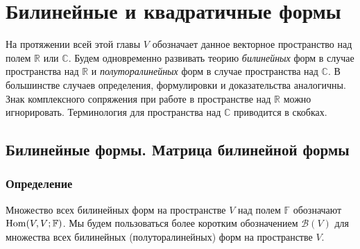 \chapter{Билинейные и квадратичные формы}\label{kvadr_formy}

На протяжении всей этой главы $V$ обозначает данное векторное пространство над полем $\mathbb{R}$ или $\mathbb{C}$.
Будем одновременно развивать теорию {\it билинейных} форм в случае пространства над $\mathbb{R}$ и 
{\it полуторалинейных} форм в случае пространства над $\mathbb{C}$. 
В большинстве случаев определения, формулировки и доказательства аналогичны.
Знак комплексного сопряжения при работе в пространстве над $\mathbb{R}$ можно игнорировать.
Терминология для пространства над $\mathbb{C}$ приводится в скобках.

\section{Билинейные формы. Матрица билинейной формы}\label{matr_bilin_formy}


\subsection{Определение}


Множество всех билинейных форм на пространстве $V$ над полем $\mathbb{F}$
обозначают  $\mathop{\rm Hom}\nolimits (V, V; \mathbb{F})$.
Мы будем пользоваться более коротким обозначением $\mathcal{B} (V)$
для множества всех билинейных (полуторалинейных) форм на пространстве $V$. 




